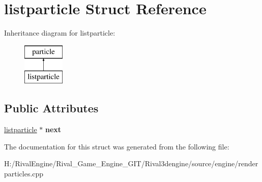 \hypertarget{structlistparticle}{}\section{listparticle Struct Reference}
\label{structlistparticle}
Inheritance diagram for listparticle\+:\begin{figure}[H]
\begin{center}
\leavevmode
\includegraphics[height=2.000000cm]{structlistparticle}
\end{center}
\end{figure}
\subsection*{Public Attributes}
\begin{DoxyCompactItemize}
\item 
\mbox{\label{structlistparticle_af9499e33a4d59a2379bc19bc0ca18cd8}} 
\hyperlink{structlistparticle}{listparticle} $\ast$ {\bfseries next}
\end{DoxyCompactItemize}


The documentation for this struct was generated from the following file\+:\begin{DoxyCompactItemize}
\item 
H\+:/\+Rival\+Engine/\+Rival\+\_\+\+Game\+\_\+\+Engine\+\_\+\+G\+I\+T/\+Rival3dengine/source/engine/renderparticles.\+cpp\end{DoxyCompactItemize}
